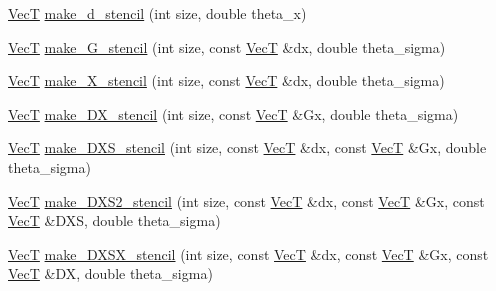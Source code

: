 \begin{DoxyCompactItemize}
\item 
\hyperlink{namespacemappel_a2225ad69f358daa3f4f99282a35b9a3a}{VecT} \hyperlink{namespacemappel_ac9d449b0121b33962da2c9c13cbb593c}{make\+\_\+d\+\_\+stencil} (int size, double theta\+\_\+x)
\item 
\hyperlink{namespacemappel_a2225ad69f358daa3f4f99282a35b9a3a}{VecT} \hyperlink{namespacemappel_aa5c2f294298c875605ee1e9876b7d116}{make\+\_\+\+G\+\_\+stencil} (int size, const \hyperlink{namespacemappel_a2225ad69f358daa3f4f99282a35b9a3a}{VecT} \&dx, double theta\+\_\+sigma)
\item 
\hyperlink{namespacemappel_a2225ad69f358daa3f4f99282a35b9a3a}{VecT} \hyperlink{namespacemappel_a7b50d0a17c085d9b25b91c2b17ecb1cc}{make\+\_\+\+X\+\_\+stencil} (int size, const \hyperlink{namespacemappel_a2225ad69f358daa3f4f99282a35b9a3a}{VecT} \&dx, double theta\+\_\+sigma)
\item 
\hyperlink{namespacemappel_a2225ad69f358daa3f4f99282a35b9a3a}{VecT} \hyperlink{namespacemappel_a8da88490d6ff7d5886b96b66c1bab369}{make\+\_\+\+D\+X\+\_\+stencil} (int size, const \hyperlink{namespacemappel_a2225ad69f358daa3f4f99282a35b9a3a}{VecT} \&Gx, double theta\+\_\+sigma)
\item 
\hyperlink{namespacemappel_a2225ad69f358daa3f4f99282a35b9a3a}{VecT} \hyperlink{namespacemappel_af7636db506977133c8b30d108fede711}{make\+\_\+\+D\+X\+S\+\_\+stencil} (int size, const \hyperlink{namespacemappel_a2225ad69f358daa3f4f99282a35b9a3a}{VecT} \&dx, const \hyperlink{namespacemappel_a2225ad69f358daa3f4f99282a35b9a3a}{VecT} \&Gx, double theta\+\_\+sigma)
\item 
\hyperlink{namespacemappel_a2225ad69f358daa3f4f99282a35b9a3a}{VecT} \hyperlink{namespacemappel_aef14b765af6f9b85d93f42ab8b84311b}{make\+\_\+\+D\+X\+S2\+\_\+stencil} (int size, const \hyperlink{namespacemappel_a2225ad69f358daa3f4f99282a35b9a3a}{VecT} \&dx, const \hyperlink{namespacemappel_a2225ad69f358daa3f4f99282a35b9a3a}{VecT} \&Gx, const \hyperlink{namespacemappel_a2225ad69f358daa3f4f99282a35b9a3a}{VecT} \&D\+XS, double theta\+\_\+sigma)
\item 
\hyperlink{namespacemappel_a2225ad69f358daa3f4f99282a35b9a3a}{VecT} \hyperlink{namespacemappel_abccec04f04b0b10940779c9bbae0e570}{make\+\_\+\+D\+X\+S\+X\+\_\+stencil} (int size, const \hyperlink{namespacemappel_a2225ad69f358daa3f4f99282a35b9a3a}{VecT} \&dx, const \hyperlink{namespacemappel_a2225ad69f358daa3f4f99282a35b9a3a}{VecT} \&Gx, const \hyperlink{namespacemappel_a2225ad69f358daa3f4f99282a35b9a3a}{VecT} \&DX, double theta\+\_\+sigma)
\item 

\end{DoxyCompactItemize}
